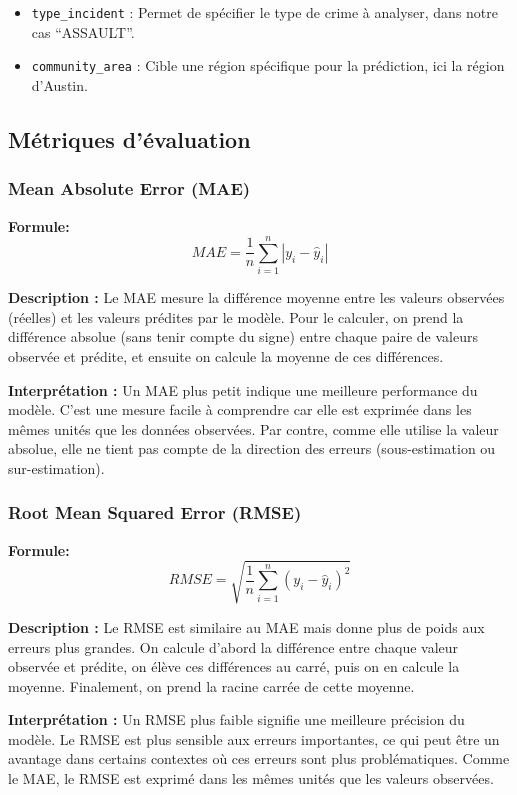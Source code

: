 \documentclass[12pt]{article}
\begin{document}
\begin{itemize}
	\item \texttt{type\_incident} : Permet de spécifier le type de crime à analyser, dans notre cas “ASSAULT”.
	\item \texttt{community\_area} : Cible une région spécifique pour la prédiction, ici la région d'Austin.
\end{itemize}



\subsection{Métriques d’évaluation}

\subsubsection{Mean Absolute Error (MAE)}

\textbf{Formule:} 
\[ MAE = \frac{1}{n} \sum_{i=1}^{n} \left| y_i - \hat{y}_i \right| \]

\textbf{Description :} Le MAE mesure la différence moyenne entre les valeurs observées (réelles) et les valeurs prédites par le modèle. Pour le calculer, on prend la différence absolue (sans tenir compte du signe) entre chaque paire de valeurs observée et prédite, et ensuite on calcule la moyenne de ces différences.

\textbf{Interprétation :} Un MAE plus petit indique une meilleure performance du modèle. C'est une mesure facile à comprendre car elle est exprimée dans les mêmes unités que les données observées. Par contre, comme elle utilise la valeur absolue, elle ne tient pas compte de la direction des erreurs (sous-estimation ou sur-estimation).

\subsubsection{Root Mean Squared Error (RMSE)}

\textbf{Formule:} 
\[ RMSE = \sqrt{\frac{1}{n} \sum_{i=1}^{n} (y_i - \hat{y}_i)^2} \]

\textbf{Description :} Le RMSE est similaire au MAE mais donne plus de poids aux erreurs plus grandes. On calcule d'abord la différence entre chaque valeur observée et prédite, on élève ces différences au carré, puis on en calcule la moyenne. Finalement, on prend la racine carrée de cette moyenne.

\textbf{Interprétation :} Un RMSE plus faible signifie une meilleure précision du modèle. Le RMSE est plus sensible aux erreurs importantes, ce qui peut être un avantage dans certains contextes où ces erreurs sont plus problématiques. Comme le MAE, le RMSE est exprimé dans les mêmes unités que les valeurs observées.
\end{document}
